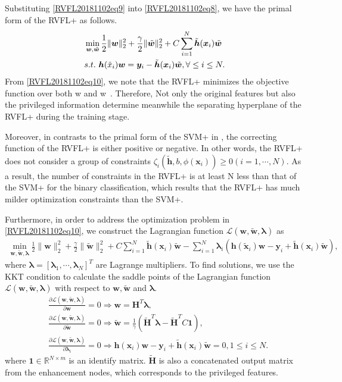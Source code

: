 Substituting \eqref{RVFL20181102eq9} into \eqref{RVFL20181102eq8}, we have the primal form of the RVFL+ as follows.
\begin{align}
&\min\limits_{{\bm w},\tilde {\bm w}} \frac 1 2\|{\bm w}\|_2^ 2 + \frac \gamma 2 \|\tilde {\bm w}\|_2^ 2 + C\sum_{i=1}^N  {\tilde {\bm h}}({\bm x}_i)\tilde {\bm w}\notag\\
&s.t.\,\,\bm h(\tilde x_i){\bm w} =\bm y_i - {\tilde {\bm h}}({\bm x}_i)\tilde {\bm w}, \forall \leq i \leq  N.\label{RVFL20181102eq10}
\end{align}
From \eqref{RVFL20181102eq10}, we note that the RVFL+ minimizes the objective function over both w and w~. Therefore, Not only the original features but also the privileged information determine meanwhile the separating hyperplane of the RVFL+ during the training stage.

Moreover, in contrasts to the primal form of the SVM+ in \cite{VAPNIK2009544}, the correcting function of the RVFL+ is either positive or negative. In other words, the RVFL+ does not consider a group of constraints $\zeta_i(\tilde {\bm h}, b, \phi({\bm x}_i)) \geq 0 (i = 1,\cdots,N)$. As a result, the number of constraints in the RVFL+ is at least N less than that of the SVM+ for the binary classification, which results that the RVFL+ has much milder optimization constraints than the SVM+.

Furthermore, in order to address the optimization problem in \eqref{RVFL20181102eq10}, we construct the Lagrangian function $\mathscr L (\bm w, \tilde{\bm w},\bm \lambda)$ as
\begin{align}
\min\limits_{\bm w, \tilde{\bm w},\bm \lambda} \frac 1 2\|{\bm w}\|_2^ 2 + \frac \gamma 2 \|\tilde {\bm w}\|_2^ 2 + C\sum_{i=1}^N  {\tilde {\bm h}}({\bm x}_i)\tilde {\bm w}-\sum_{i=1}^N  \bm \lambda_i(\bm h(\tilde {\bm x}_i){\bm w} -\bm y_i +{\tilde {\bm h}}({\bm x}_i)\tilde {\bm w}),
\end{align}
where $\bm \lambda = [\bm \lambda_1,\cdots, \bm \lambda_N]^T$ are Lagrange multipliers. To find solutions, we use the KKT condition to calculate the saddle points of the Lagrangian function $\mathscr L (\bm w, \tilde{\bm w},\bm \lambda)$ with respect to $\bm w, \tilde{\bm w}$ and $\bm \lambda$.
\begin{align}
 &\frac {\partial \mathscr L (\bm w, \tilde{\bm w},\bm \lambda)}{\partial \bm w}= 0 \Rightarrow  \bm w = \bm  H^T \bm \lambda, \label{RVFL20181102eq12}\\
 &\frac {\partial \mathscr L (\bm w, \tilde{\bm w},\bm \lambda)}{\partial \tilde{\bm w}} = 0 \Rightarrow  \tilde{\bm w} = \frac 1  \gamma  (\tilde{\bm  H}^T  \bm \lambda - \tilde{\bm  H}^T C \bm 1), \label{RVFL20181102eq13}\\
 &\frac {\partial \mathscr L (\bm w, \tilde{\bm w},\bm \lambda)}{\partial \bm \lambda_i} = 0 \Rightarrow  \bm h(\bm x_i)\bm w - \bm y_i + \tilde {\bm h}({\bm x}_i) \tilde{\bm w} = 0, 1 \leq  i \leq  N.\label{RVFL20181102eq14}
\end{align}
where $\bm 1 \in \mathbb R^{N\times m}$ is an identify matrix. $\tilde {\bm H}$ is also a concatenated output matrix from the enhancement nodes, which corresponds to the privileged features.

